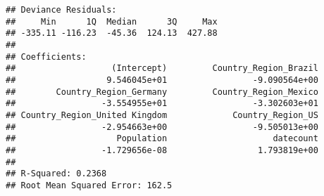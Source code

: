 \documentclass[]{article}
\begin{document}
\begin{verbatim}
## Deviance Residuals:
##     Min      1Q  Median      3Q     Max 
## -335.11 -116.23  -45.36  124.13  427.88 
## 
## Coefficients:
##                   (Intercept)         Country_Region_Brazil 
##                  9.546045e+01                 -9.090564e+00 
##        Country_Region_Germany         Country_Region_Mexico 
##                 -3.554955e+01                 -3.302603e+01 
## Country_Region_United Kingdom             Country_Region_US 
##                 -2.954663e+00                 -9.505013e+00 
##                    Population                     datecount 
##                 -1.729656e-08                  1.793819e+00 
## 
## R-Squared: 0.2368
## Root Mean Squared Error: 162.5
\end{verbatim}
\end{document}
